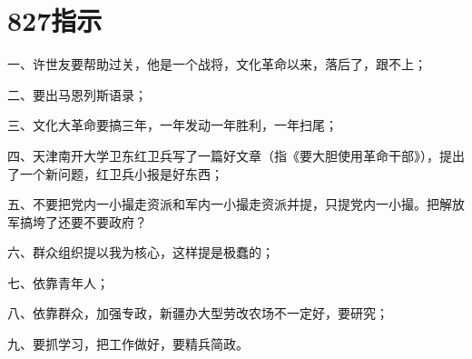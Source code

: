 \section[827指示（一九六七年八月二十七日）]{827指示}


一、许世友要帮助过关，他是一个战将，文化革命以来，落后了，跟不上；

二、要出马恩列斯语录；

三、文化大革命要搞三年，一年发动一年胜利，一年扫尾；

四、天津南开大学卫东红卫兵写了一篇好文章（指《要大胆使用革命干部》），提出了一个新问题，红卫兵小报是好东西；

五、不要把党内一小撮走资派和军内一小撮走资派并提，只提党内一小撮。把解放军搞垮了还要不要政府？

六、群众组织提以我为核心，这样提是极蠢的；

七、依靠青年人；

八、依靠群众，加强专政，新疆办大型劳改农场不一定好，要研究；

九、要抓学习，把工作做好，要精兵简政。

